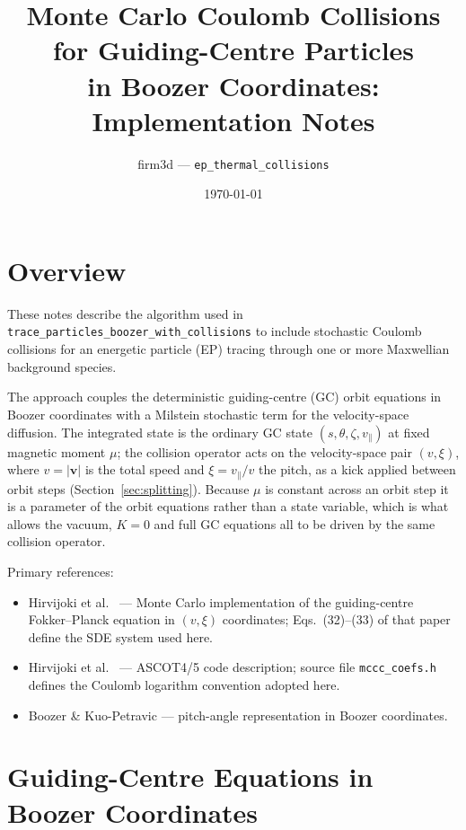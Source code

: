 \documentclass[11pt]{article}
\title{Monte Carlo Coulomb Collisions for Guiding-Centre Particles\\
       in Boozer Coordinates: Implementation Notes}
\author{firm3d --- \texttt{ep\_thermal\_collisions}}
\date{\today}
\newcommand{\vpar}{v_{\!\parallel}}
\begin{document}
\maketitle
\tableofcontents
\bigskip

\section{Overview}

These notes describe the algorithm used in \texttt{trace\_particles\_boozer\_with\_collisions}
to include stochastic Coulomb collisions for an energetic particle (EP) tracing through
one or more Maxwellian background species.

The approach couples the deterministic guiding-centre (GC) orbit equations in Boozer
coordinates with a Milstein stochastic term for the velocity-space diffusion.  The
integrated state is the ordinary GC state $(s,\theta,\zeta,\vpar)$ at fixed magnetic
moment $\mu$; the collision operator acts on the velocity-space pair
$(v,\xi)$, where $v=|\bm{v}|$ is the total speed and $\xi=\vpar/v$ the pitch, as a
kick applied between orbit steps (Section~\ref{sec:splitting}).  Because $\mu$ is
constant across an orbit step it is a parameter of the orbit equations rather than a
state variable, which is what allows the vacuum, $K=0$ and full GC equations all to be
driven by the same collision operator.

Primary references:
\begin{itemize}
  \item Hirvijoki et al.\ \cite{hirvijoki2013} --- Monte Carlo implementation of the
        guiding-centre Fokker--Planck equation in $(v,\xi)$ coordinates; Eqs.\ (32)--(33)
        of that paper define the SDE system used here.
  \item Hirvijoki et al.\ \cite{hirvijoki2014} --- ASCOT4/5 code description; source
        file \texttt{mccc\_coefs.h} defines the Coulomb logarithm convention adopted here.
  \item Boozer \& Kuo-Petravic \cite{boozer1981} --- pitch-angle representation
        in Boozer coordinates.
\end{itemize}

\section{Guiding-Centre Equations in Boozer Coordinates}
\end{document}
